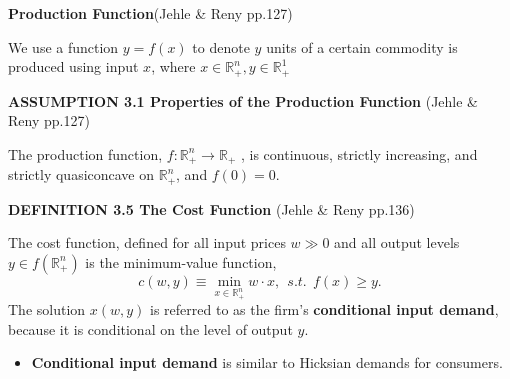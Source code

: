 \documentclass{article}
\newcommand{\R}{\mathbb{R}}
\begin{document}
\begin{mdframed}[backgroundcolor=blue!20,linecolor=white]

\textbf{Production Function}(Jehle \& Reny pp.127)

We use a function $y = f(x)$ to denote $y$ units of a certain commodity is produced using input $x$, where $x \in \R^n_+, y \in \R^1_+$

\vspace{2mm}

\textbf{ASSUMPTION 3.1 Properties of the Production Function} (Jehle \& Reny pp.127)

The production function, $f : \R^n_+ \to \R_+$ , is continuous, strictly increasing, and strictly
quasiconcave on $\R^n_+$, and $f (0) = 0$.

\vspace{2mm}

\textbf{DEFINITION 3.5 The Cost Function} (Jehle \& Reny pp.136)

The cost function, defined for all input prices $w \gg 0$ and all output levels $y \in f(\R^n_+)$ is the
minimum-value function,
$$c(w,y) \equiv \min_{x \in \R^n_+} w \cdot x , \ \ s.t. \ \ f(x) \ge y.$$
The solution $x(w, y)$ is referred to as the firm’s \textbf{conditional input demand}, because it is conditional on the level of output $y$.

\begin{itemize}
\item  \textbf{Conditional input demand} is similar to Hicksian demands for consumers.
\end{itemize}

\end{mdframed}

\vspace{2mm}
\end{document}
